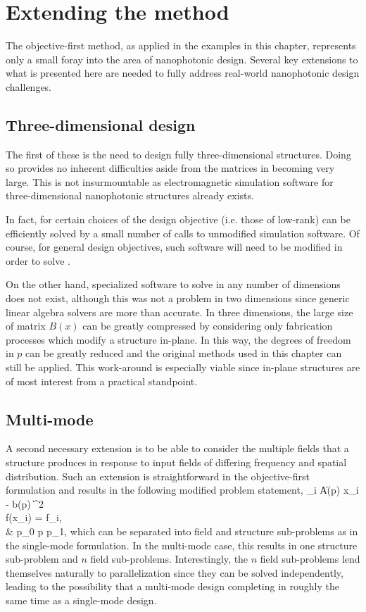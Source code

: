 
\section{Extending the method}
The objective-first method, as applied in the examples in this chapter,
    represents only a small foray into the area of nanophotonic design.
Several key extensions to what is presented here are needed to
    fully address real-world nanophotonic design challenges.

\subsection{Three-dimensional design}
The first of these is the need to design fully three-dimensional structures.
Doing so provides no inherent difficulties aside from the matrices in
     becoming very large.
This is not insurmountable as electromagnetic simulation software for 
    three-dimensional nanophotonic structures already exists.

In fact, for certain choices of the design objective 
    (i.e. those of low-rank) 
     can be efficiently solved by a small number of calls
    to unmodified simulation software. 
Of course, for general design objectives, such software will need 
    to be modified in order to solve .

On the other hand, specialized software to solve  in 
    any number of dimensions does not exist,
    although this was not a problem in two dimensions since generic 
    linear algebra solvers are more than accurate.
In three dimensions, 
    the large size of matrix $B(x)$ can be greatly compressed by considering
    only fabrication processes which modify a structure in-plane.
In this way, the degrees of freedom in $p$ can be greatly reduced and the original
    methods used in this chapter can still be applied.
This work-around is especially viable since in-plane structures are 
    of most interest from a practical standpoint.
    
\subsection{Multi-mode}
A second necessary extension is to be able to consider the multiple fields
    that a structure produces in response to input fields of differing frequency
    and spatial distribution.
Such an extension is straightforward in the objective-first formulation
    and results in the following modified problem statement,
\BA {} \sum_i \| A(p) x_i - b(p) \|^2 \notag \\
    \subto f(x_i) = f_{i,} \quad {} \\
        & p_0 \le p \le p_1, \notag \EA
    which can be separated into field and structure sub-problems 
    as in the single-mode formulation.
In the multi-mode case, this results in one structure sub-problem 
    and $n$ field sub-problems.
Interestingly, the $n$ field sub-problems lend themselves 
    naturally to parallelization
    since they can be solved independently,
    leading to the possibility that a multi-mode design completing in
    roughly the same time as a single-mode design.

